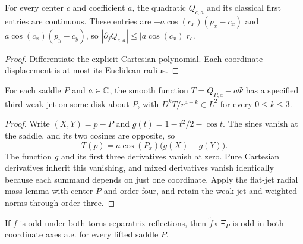 \begin{lemma}
\label{lem:saddle-quadratic-first-jet}
\leanok
For every center $c$ and coefficient $a$, the quadratic $Q_{c,a}$ and its
classical first entries are continuous. These entries are
$-a\cos(c_x)(p_x-c_x)$ and $a\cos(c_x)(p_y-c_y)$, so
$|\partial_jQ_{c,a}|\le|a\cos(c_x)|r_c$.
\end{lemma}

\begin{proof}
\leanok
Differentiate the explicit Cartesian polynomial.
Each coordinate displacement is at most its Euclidean radius.
\end{proof}

\begin{lemma}
\label{lem:saddle-taylor-correction}
\leanok
For each saddle $P$ and $a\in\mathbb{C}$, the smooth function
$T=Q_{P,a}-a\Psi$ has a specified third weak jet on some disk about $P$,
with $D^kT/r^{4-k}\in L^2$ for every $0\le k\le3$.
\end{lemma}

\begin{proof}
\leanok
Write $(X,Y)=p-P$ and $g(t)=1-t^2/2-\cos t$. The sines vanish at the
saddle, and its two cosines are opposite, so
\[
 T(p)=a\cos(P_x)\bigl(g(X)-g(Y)\bigr).
\]
The function $g$ and its first three derivatives vanish at zero. Pure
Cartesian derivatives inherit this vanishing, and mixed derivatives vanish
identically because each summand depends on just one coordinate. Apply the
flat-jet radial mass lemma with center $P$ and order four, and retain the
weak jet and weighted norms through order three.
\end{proof}

\begin{lemma}
\label{lem:saddle-chart-parity}
\leanok
If $f$ is odd under both torus separatrix reflections, then
$\widetilde f\circ\Xi_P$ is odd in both coordinate axes a.e.
for every lifted saddle $P$.
\end{lemma}

